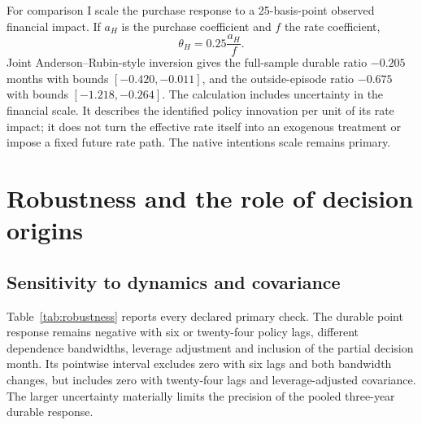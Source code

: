 \documentclass[11pt,a4paper]{article}
\begin{document}
For comparison I scale the purchase response to a 25-basis-point observed financial impact. If $a_H$ is the purchase coefficient and $f$ the rate coefficient,
\begin{equation}
 \theta_H=0.25\frac{a_H}{f}.\label{eq:ratio}
\end{equation}
Joint Anderson--Rubin-style inversion gives the full-sample durable ratio $-0.205$ months with bounds $[-0.420,-0.011]$, and the outside-episode ratio $-0.675$ with bounds $[-1.218,-0.264]$. The calculation includes uncertainty in the financial scale. It describes the identified policy innovation per unit of its rate impact; it does not turn the effective rate itself into an exogenous treatment or impose a fixed future rate path. The native intentions scale remains primary.

\section{Robustness and the role of decision origins}

\subsection{Sensitivity to dynamics and covariance}

Table~\ref{tab:robustness} reports every declared primary check. The durable point response remains negative with six or twenty-four policy lags, different dependence bandwidths, leverage adjustment and inclusion of the partial decision month. Its pointwise interval excludes zero with six lags and both bandwidth changes, but includes zero with twenty-four lags and leverage-adjusted covariance. The larger uncertainty materially limits the precision of the pooled three-year durable response.
\end{document}
